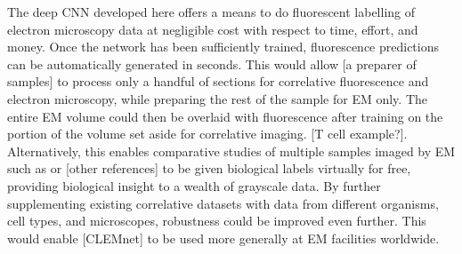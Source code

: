 The deep CNN developed here offers a means to do fluorescent labelling of electron microscopy data at negligible cost with respect to time, effort, and money. Once the network has been sufficiently trained, fluorescence predictions can be automatically generated in seconds. This would allow [a preparer of samples] to process only a handful of sections for correlative fluorescence and electron microscopy, while preparing the rest of the sample for EM only. The entire EM volume could then be overlaid with fluorescence after training on the portion of the volume set aside for correlative imaging. [T cell example?]. Alternatively, this enables comparative studies of multiple samples imaged by EM such as \cite{de2020large} or [other references] to be given biological labels virtually for free, providing biological insight to a wealth of grayscale data. 
By further supplementing existing correlative datasets with data from different organisms, cell types, and microscopes, robustness could be improved even further. This would enable [CLEMnet] to be used more generally at EM facilities worldwide.




